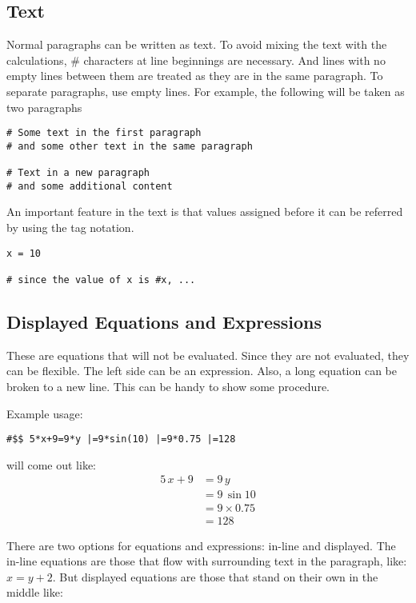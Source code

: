 \documentclass[12pt]{article}
\begin{document}
\subsection{Text}

Normal paragraphs can be written as text. To avoid mixing the text with the
calculations, \# characters at line beginnings are necessary. And lines with no
empty lines between them are treated as they are in the same paragraph. To
separate paragraphs, use empty lines.  For example, the following will be taken
as two paragraphs

\begin{verbatim}
# Some text in the first paragraph
# and some other text in the same paragraph

# Text in a new paragraph
# and some additional content
\end{verbatim}

An important feature in the text is that values assigned before it can be
referred by using the tag notation.

\begin{verbatim}
x = 10

# since the value of x is #x, ...
\end{verbatim}

\subsection{Displayed Equations and Expressions}

These are equations that will not be evaluated. Since they are not evaluated,
they can be flexible. The left side can be an expression. Also, a long equation
can be broken to a new line. This can be handy to show some procedure.

Example usage:
\begin{verbatim}
#$$ 5*x+9=9*y |=9*sin(10) |=9*0.75 |=128
\end{verbatim}

will come out like:
\[
    \begin{aligned}
        5\,x + 9 &=9\, y\\
                 &=9\, \sin{10}\\
                 &=9\times 0.75\\
                 &=128
    \end{aligned}
\]

There are two options for equations and expressions: in-line and displayed. The
in-line equations are those that flow with surrounding text in the paragraph,
like: $x = y + 2$. But displayed equations are those that stand on their own in
the middle like:
\end{document}
